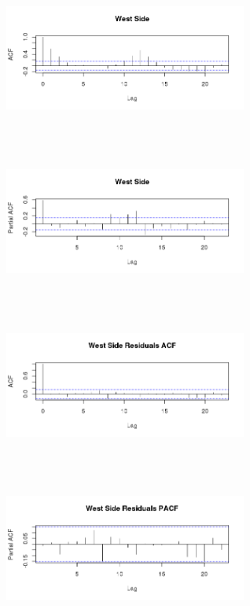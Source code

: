 \documentclass{article} %
\begin{document}
\begin{multicols}{2}
 \begin{figure}[H]
\includegraphics[height=50mm, width=80mm]{Plots/West_ACF.png}
\end{figure}
 
\begin{figure}[H]
\includegraphics[height=50mm, width=80mm]{Plots/West_PACF.png}
\end{figure}
 
\begin{figure}[H]
\includegraphics[height=50mm, width=80mm]{Plots/west_resids_ACF.png}
\end{figure}
 
\begin{figure}[H]
\includegraphics[height=50mm, width=80mm]{Plots/west_resids_PACF.png}
\end{figure}
 \end{multicols}
 
\end{document}
